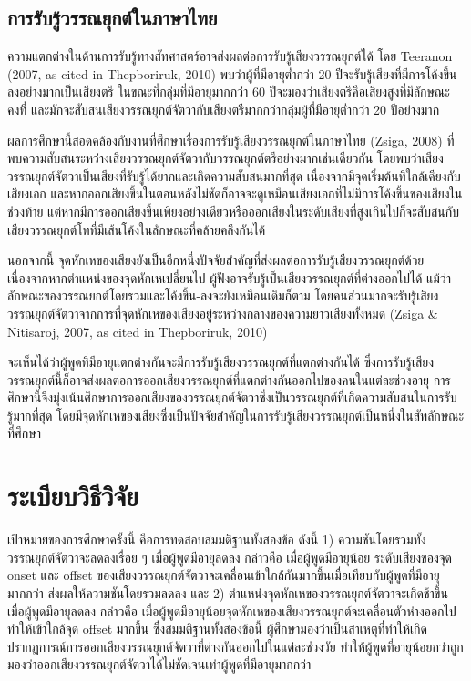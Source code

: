 \documentclass[a4paper]{article}
\begin{document}
\subsection{การรับรู้วรรณยุกต์ในภาษาไทย}
    ความแตกต่างในด้านการรับรู้ทางสัทศาสตร์อาจส่งผลต่อการรับรู้เสียงวรรณยุกต์ได้ โดย Teeranon (2007, as cited in Thepboriruk, 2010) พบว่าผู้ที่มีอายุต่ำกว่า 20 ปีจะรับรู้เสียงที่มีการโค้งขึ้น-ลงอย่างมากเป็นเสียงตรี ในขณะที่กลุ่มที่มีอายุมากกว่า 60 ปีจะมองว่าเสียงตรีคือเสียงสูงที่มีลักษณะคงที่ และมักจะสับสนเสียงวรรณยุกต์จัตวากับเสียงตรีมากกว่ากลุ่มผู้ที่มีอายุต่ำกว่า 20 ปีอย่างมาก

    ผลการศึกษานี้สอดคล้องกับงานที่ศึกษาเรื่องการรับรู้เสียงวรรณยุกต์ในภาษาไทย (Zsiga, 2008) ที่พบความสับสนระหว่างเสียงวรรณยุกต์จัตวากับวรรณยุกต์ตรีอย่างมากเช่นเดียวกัน โดยพบว่าเสียงวรรณยุกต์จัตวาเป็นเสียงที่รับรู้ได้ยากและเกิดความสับสนมากที่สุด เนื่องจากมีจุดเริ่มต้นที่ใกล้เคียงกับเสียงเอก และหากออกเสียงขึ้นในตอนหลังไม่ชัดก็อาจจะดูเหมือนเสียงเอกที่ไม่มีการโค้งขึ้นของเสียงในช่วงท้าย แต่หากมีการออกเสียงขึ้นเพียงอย่างเดียวหรือออกเสียงในระดับเสียงที่สูงเกินไปก็จะสับสนกับเสียงวรรณยุกต์โทที่มีเส้นโค้งในลักษณะที่คล้ายคลึงกันได้

    นอกจากนี้ จุดหักเหของเสียงยังเป็นอีกหนึ่งปัจจัยสำคัญที่ส่งผลต่อการรับรู้เสียงวรรณยุกต์ด้วย เนื่องจากหากตำแหน่งของจุดหักเหเปลี่ยนไป ผู้ฟังอาจรับรู้เป็นเสียงวรรณยุกต์ที่ต่างออกไปได้ แม้ว่าลักษณะของวรรณยกต์โดยรวมและโค้งขึ้น-ลงจะยังเหมือนเดิมก็ตาม โดยคนส่วนมากจะรับรู้เสียงวรรณยุกต์จัตวาจากการที่จุดหักเหของเสียงอยู่ระหว่างกลางของความยาวเสียงทั้งหมด (Zsiga \& Nitisaroj, 2007, as cited in Thepboriruk, 2010)

    จะเห็นได้ว่าผู้พูดที่มีอายุแตกต่างกันจะมีการรับรู้เสียงวรรณยุกต์ที่แตกต่างกันได้ ซึ่งการรับรู้เสียงวรรณยุกต์นี้ก็อาจส่งผลต่อการออกเสียงวรรณยุกต์ที่แตกต่างกันออกไปของคนในแต่ละช่วงอายุ การศึกษานี้จึงมุ่งเน้นศึกษาการออกเสียงของวรรณยุกต์จัตวาซึ่งเป็นวรรณยุกต์ที่เกิดความสับสนในการรับรู้มากที่สุด โดยมีจุดหักเหของเสียงซึ่งเป็นปัจจัยสำคัญในการรับรู้เสียงวรรณยุกต์เป็นหนึ่งในสัทลักษณะที่ศึกษา
\section{ระเบียบวิธีวิจัย}
    เป้าหมายของการศึกษาครั้งนี้ คือการทดสอบสมมติฐานทั้งสองข้อ ดังนี้ 1) ความชันโดยรวมทั้งวรรณยุกต์จัตวาจะลดลงเรื่อย ๆ เมื่อผู้พูดมีอายุลดลง กล่าวคือ เมื่อผู้พูดมีอายุน้อย ระดับเสียงของจุด onset และ offset ของเสียงวรรณยุกต์จัตวาจะเคลื่อนเข้าใกล้กันมากขึ้นเมื่อเทียบกับผู้พูดที่มีอายุมากกว่า ส่งผลให้ความชันโดยรวมลดลง และ 2)  ตำแหน่งจุดหักเหของวรรณยุกต์จัตวาจะเกิดช้าขึ้น เมื่อผู้พูดมีอายุลดลง กล่าวคือ เมื่อผู้พูดมีอายุน้อยจุดหักเหของเสียงวรรณยุกต์จะเคลื่อนตัวห่างออกไป ทำให้เข้าใกล้จุด offset มากขึ้น ซึ่งสมมติฐานทั้งสองข้อนี้ ผู้ศึกษามองว่าเป็นสาเหตุที่ทำให้เกิดปรากฏการณ์การออกเสียงวรรณยุกต์จัตวาที่ต่างกันออกไปในแต่ละช่วงวัย ทำให้ผู้พูดที่อายุน้อยกว่าถูกมองว่าออกเสียงวรรณยุกต์จัตวาได้ไม่ชัดเจนเท่าผู้พูดที่มีอายุมากกว่า
\end{document}
